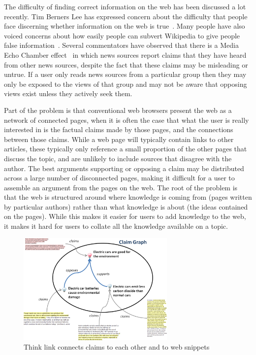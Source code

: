 \documentclass{chi2009}
\begin{document}
The difficulty of finding correct information on the web has been discussed a lot recently. Tim Berners Lee has expressed concern about the difficulty that people face discerning whether information on the web is true~\cite{bbcwebwarning}. Many people have also voiced concerns about how easily people can subvert Wikipedia to give people false information~\cite{wikifalse}. Several commentators have observed that there is a Media Echo Chamber effect~\cite{echochamber,echochamber2} in which news sources report claims that they have heard from other news sources, despite the fact that these claims may be misleading or untrue. If a user only reads news sources from a particular group then they may only be exposed to the views of that group and may not be aware that opposing views exist unless they actively seek them.  

Part of the problem is that conventional web browsers present the web as a network of connected pages, when it is often the case that what the user is really interested in is the factual claims made by those pages, and the connections between those claims. While a web page will typically contain links to other articles, these typically only reference a small proportion of the other pages that discuss the topic, and are unlikely to include sources that disagree with the author. The best arguments supporting or opposing a claim may be distributed across a large number of disconnected pages, making it difficult for a user to assemble an argument from the pages on the web. The root of the problem is that the web is structured around where knowledge is coming from (pages written by particular authors) rather than what knowledge is about (the ideas contained on the pages). While this makes it easier for users to add knowledge to the web, it makes it hard for users to collate all the knowledge available on a topic.

\begin{figure}[tb]
	\begin{center}
	\includegraphics[width=7.7cm]{../screenshots/summary_graph.png}
	\caption{Think link connects claims to each other and to web snippets}
	\label{summarygraph}
	\end{center}
\end{figure}
\end{document}
